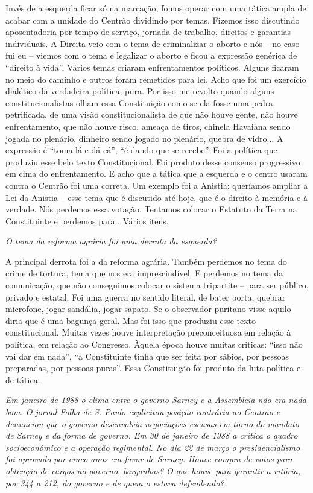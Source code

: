 Invés de a esquerda ficar só na marcação, fomos operar com uma tática
ampla de acabar com a unidade do Centrão dividindo por temas. Fizemos
isso discutindo aposentadoria por tempo de serviço, jornada de trabalho,
direitos e garantias individuais. A Direita veio com o tema de
criminalizar o aborto e nós -- no caso fui eu -- viemos com o tema e
legalizar o aborto e ficou a expressão genérica de ``direito à vida''.
Vários temas criaram enfrentamentos políticos. Alguns ficaram no meio do
caminho e outros foram remetidos para lei. Acho que foi um exercício
dialético da verdadeira política, pura. Por isso me revolto quando
alguns constitucionalistas olham essa Constituição como se ela fosse uma
pedra, petrificada, de uma visão constitucionalista de que não houve
gente, não houve enfrentamento, que não houve risco, ameaça de tiros,
chinela Havaiana sendo jogada no plenário, dinheiro sendo jogado no
plenário, quebra de vidro... A expressão é ``toma lá e dá cá'', ``é
dando que se recebe''. Foi a política que produziu esse belo texto
Constitucional. Foi produto desse consenso progressivo em cima do
enfrentamento. E acho que a tática que a esquerda e o centro usaram
contra o Centrão foi uma correta. Um exemplo foi a Anistia: queríamos
ampliar a Lei da Anistia -- esse tema que é discutido até hoje, que é o
direito à memória e à verdade. Nós perdemos essa votação. Tentamos
colocar o Estatuto da Terra na Constituinte e perdemos para . Vários
itens.

\medskip

\noindent\emph{O tema da reforma agrária foi uma derrota da esquerda?}

A principal derrota foi a da reforma agrária. Também
perdemos no tema do crime de tortura, tema que nos era imprescindível. E
perdemos no tema da comunicação, que não conseguimos colocar o sistema
tripartite -- para ser público, privado e estatal. Foi uma guerra no
sentido literal, de bater porta, quebrar microfone, jogar sandália,
jogar sapato. Se o observador puritano visse aquilo diria que é uma
bagunça geral. Mas foi isso que produziu esse texto constitucional.
Muitas vezes houve interpretação preconceituosa em relação à política,
em relação ao Congresso. Àquela época houve muitas criticas: ``isso não
vai dar em nada'', ``a Constituinte tinha que ser feita por sábios, por
pessoas preparadas, por pessoas puras''. Essa Constituição foi produto
da luta política e de tática.

\medskip

\noindent\emph{Em janeiro de 1988 o clima entre o governo Sarney e a Assembleia
não era nada bom. O jornal Folha de S. Paulo explicitou posição
contrária ao Centrão e denunciou que o governo desenvolvia negociações
escusas em torno do mandato de Sarney e da forma de governo. Em 30 de
janeiro de 1988 a  critica o quadro socioeconômico e a operação
regimental. No dia 22 de março o presidencialismo foi aprovado por cinco
anos em favor de Sarney. Houve compra de votos para obtenção de cargos
no governo, barganhas? O que houve para garantir a vitória, por 344 a
212, do governo e de quem o estava defendendo?}

